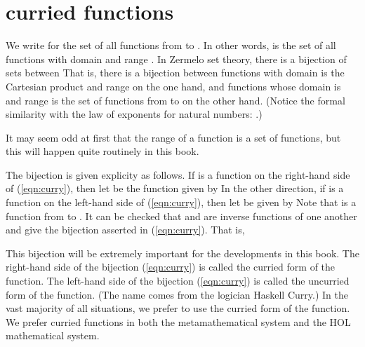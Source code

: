 \section{curried functions}

We write  for the set of all functions from  to .  In other
words,  is the set of all functions with domain  and range .
In Zermelo set theory, there is a bijection of sets between
That is, there is a bijection between functions with domain is the Cartesian product  and range  on the one hand, and functions whose domain is  and range is the set of functions from  to  on the other hand.
(Notice the formal similarity with the law of exponents for natural numbers:
.)

It may seem odd at first that the range of a function is a set of functions, but this will happen quite routinely in this book.

The bijection is given explicity as follows.  If  is a function
on the right-hand side of (\ref{eqn:curry}), then let 
be the function given by 
In the other direction, if  is a function on the left-hand side of (\ref{eqn:curry}), then let  be given by
Note that  is a function from  to .
It can be  checked that  and  are inverse functions of one another and give the bijection asserted in (\ref{eqn:curry}).
That is,

This bijection will be extremely important for the developments in this book.  The right-hand side of the bijection (\ref{eqn:curry}) is called the curried form of the function.  The left-hand side of the bijection (\ref{eqn:curry}) is called the uncurried form of the function.  (The name comes from the logician Haskell Curry.)   In the vast majority of all situations, we prefer to use the curried form of the function.  We prefer curried functions in both the metamathematical system and the HOL mathematical system.

